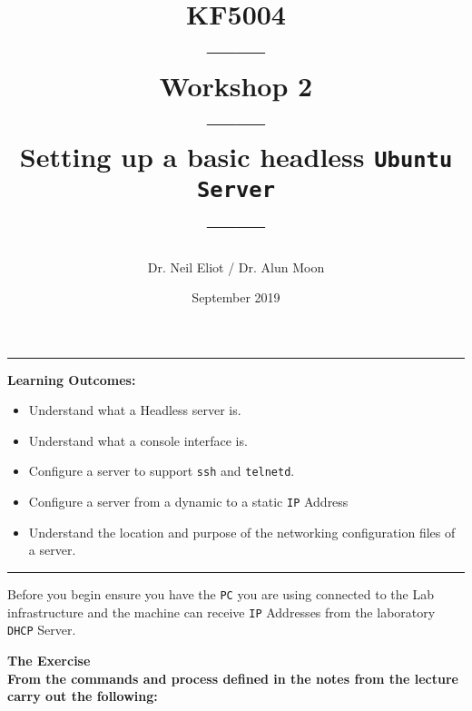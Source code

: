 \documentclass[11pt]{article}
\begin{document}
\author{Dr. Neil Eliot / Dr. Alun Moon}
\title{KF5004\\------\\Workshop 2\\------\\Setting up a basic headless \texttt{Ubuntu Server}\\------}
\date{September 2019}
\maketitle

\medskip

\begin{center}
    \noindent\rule{8cm}{0.4pt}
\end{center}


\noindent\textbf{Learning Outcomes:}
\begin{itemize}
    \item Understand what a Headless server is.
    \item Understand what a console interface is.
    \item Configure a server to support \texttt{ssh} and \texttt{telnetd}.
    \item Configure a server from a dynamic to a static \texttt{IP} Address
    \item Understand the location and purpose of the networking configuration files of a server.
\end{itemize}

\begin{center}
\noindent\rule{8cm}{0.4pt}
\end{center}

\begin{tcolorbox}[title={\textbf{Note:}}]
    Before you begin ensure you have the \texttt{PC} you are using connected to the Lab infrastructure and the machine can receive \texttt{IP} Addresses from the laboratory \texttt{DHCP} Server.
\end{tcolorbox}

\noindent\textbf{The Exercise}\\

\noindent \textbf{From the commands and process defined in the notes from the lecture carry out the following:\\}
\end{document}
